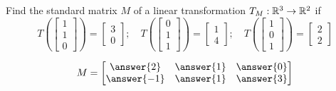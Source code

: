 \documentclass{ximera}
\author{Anna Davis}
\begin{document}
\begin{exercise}
Find the standard matrix $M$ of a linear transformation $T_M:\mathbb{R}^3\rightarrow \mathbb{R}^2$ if
$$T\left(\begin{bmatrix}1\\1\\0\end{bmatrix}\right)=\begin{bmatrix}3\\0\end{bmatrix};\quad T\left(\begin{bmatrix}0\\1\\1\end{bmatrix}\right)=\begin{bmatrix}1\\4\end{bmatrix};\quad T\left(\begin{bmatrix}1\\0\\1\end{bmatrix}\right)=\begin{bmatrix}2\\2\end{bmatrix}$$

$$M=\begin{bmatrix}\answer{2} & \answer{1} & \answer{0}\\\answer{-1} &\answer{1} & \answer{3}\end{bmatrix}$$

 \end{exercise}
 
\end{document}

